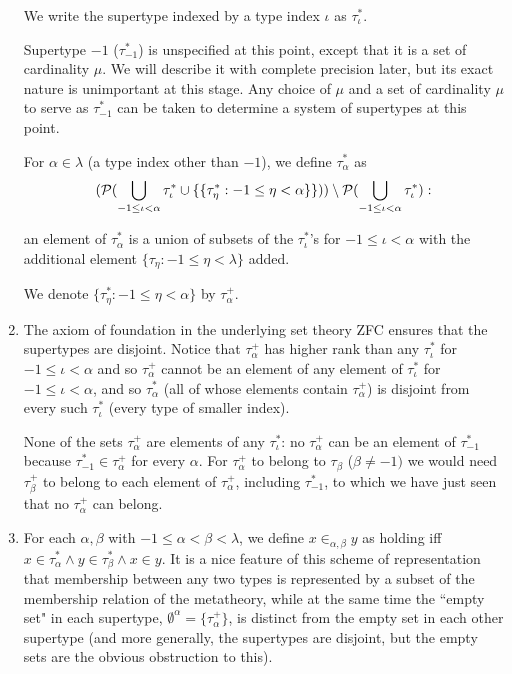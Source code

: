 \documentclass[12pt]{article}
\begin{document}
\begin{enumerate}
We write the supertype indexed by a type index $\iota$ as $\tau^*_\iota$.

Supertype $-1$ ($\tau^*_{-1}$) is unspecified at this point, except that it is a set of cardinality $\mu$.  We will describe it with complete precision later, but its exact nature is unimportant at this stage.  Any choice of $\mu$ and a set of cardinality $\mu$ to serve as $\tau^*_{-1}$ can be taken to determine a system of supertypes at this point.

For $\alpha\in \lambda$ (a type index other than $-1$), we define $\tau^*_\alpha$ as $$({\cal P} (\bigcup_{-1 \leq \iota<\alpha} \tau^*_\iota \cup \{\{\tau^*_\eta:-1\leq \eta <\alpha\}\})) \setminus {\cal P} (\bigcup_{-1 \leq \iota<\alpha}\tau^*_\iota):$$

an element of $\tau^*_\alpha$ is a union of subsets of the $\tau^*_\iota$'s for $-1\leq \iota <\alpha$ with the additional element $\{\tau_\eta:-1\leq \eta <\lambda\}$ added.

We denote $\{\tau^*_\eta:-1\leq \eta <\alpha\}$ by $\tau^+_{\alpha}$.

\item The axiom of foundation in the underlying set theory ZFC ensures that the supertypes are disjoint.  Notice that $\tau^+_{\alpha}$ has higher rank than any $\tau^*_\iota$ for
$-1\leq \iota <\alpha$ and so $\tau^+_{\alpha}$ cannot be an element of any element of $\tau^*_\iota$ for $-1\leq \iota<\alpha$, and so $\tau^*_\alpha$ (all of whose elements contain $\tau^+_{\alpha}$)  is disjoint from every
such $\tau^*_\iota$ (every type of smaller index).

None of the sets $\tau^+_{\alpha}$ are elements of any $\tau^*_\iota$:  no  $\tau^+_{\alpha}$ can be an element of $\tau^*_{-1}$ because $\tau^*_{-1} \in \tau^+_{\alpha}$ for every
$\alpha$.  For $\tau^+_{\alpha}$ to belong to $\tau_\beta$ ($\beta \neq -1)$ we would need $\tau^+_{\beta}$ to belong to each element of $\tau^+_\alpha$, including
$\tau^*_{-1}$, to which we have just seen that no $\tau^+_{\alpha}$ can belong.

\item For each $\alpha,\beta$ with $-1\leq\alpha<\beta<\lambda$, we define $x \in_{\alpha,\beta} y$ as holding iff $x \in \tau^*_\alpha \wedge y \in \tau^*_\beta \wedge x \in y$.  It is a nice feature of this scheme of representation that membership
between any two types is represented by a subset of the membership relation of the metatheory, while at the same time the ``empty set" in each supertype, $\emptyset^\alpha = \{\tau^+_\alpha\}$, is distinct from the empty set in each other supertype (and more generally, the supertypes are disjoint, but the empty sets are the obvious obstruction to this).


\end{enumerate}
\end{document}

